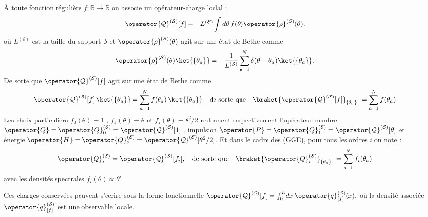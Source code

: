 À toute fonction régulière
\(
  f:\mathbb R\!\to\!\mathbb R
\)
on associe un opérateur-charge loclal :
\begin{eqnarray}\label{chap.2.charge.f.1}
	\operator{\mathcal{Q}}^{(\mathcal{S})}[f] & = &  L^{(\mathcal{S})} \int d\theta \, f(\theta) \operator{\rho}^{(\mathcal{S})}(\theta).	
\end{eqnarray}
où $ L^{(\mathcal{S})}$ est la taille du support $\mathcal{S}$ et  $\operator{\rho}^{(\mathcal{S})}(\theta)$ agit sur une état de Bethe comme 
\begin{eqnarray}\label{chap.2.rho.1}
	 \operator{\rho}^{(\mathcal{S})}(\theta) \ket{ \{ \theta_a \} } &=& \frac{1}{L^{(\mathcal{S})}} \sum_{a = 1 }^N  \delta ( \theta - \theta_a ) \ket{ \{ \theta_a \} }.	
\end{eqnarray}
De sorte que $\operator{\mathcal{Q}}^{(\mathcal{S})}[f]$ agit sur une état de Bethe comme
\begin{eqnarray}\label{chap.2.charge.1}
	\operator{\mathcal{Q}}^{(\mathcal{S})}[f]\,\ket{\{\theta_a\} } =  \sum_{a=1}^{N}f(\theta_a)\,\ket{\{\theta_a\} } \quad \mbox{de sorte que} \quad \braket{\operator{\mathcal{Q}}^{(\mathcal{S})}[f]}_{\{\theta_a\}} = \sum_{a=1}^N f(\theta_a)
\end{eqnarray}
Les choix particuliers
\(
  f_0(\theta)=1
\)
,
\(
  f_1(\theta)=\theta
\)
et
\(
  f_2(\theta)=\theta^{2}/2
\)
redonnent respectivement l'opérateur nombre \(\operator{Q}=\operator{Q}_0^{(\mathcal{S})} = \operator{\mathcal{Q}}^{(\mathcal{S})}[1]\) , impulsion \(\operator{P}=\operator{Q}_1^{(\mathcal{S})} = \operator{\mathcal{Q}}^{(\mathcal{S})}[\theta]\) et énergie
\(\operator{H}=\operator{Q}_2^{(\mathcal{S})} = \operator{\mathcal{Q}}^{(\mathcal{S})}[\theta^2/2]\). Et dans le cadre des (\gls{GGE}), pour tous les ordres $i$ on note :
\begin{eqnarray}\label{chap.2.charge.ordre.i.1}
	\operator{Q}^{(\mathcal{S})}_i = \operator{\mathcal{Q}}^{(\mathcal{S})}[f_i]	, \quad \mbox{de sorte que} \quad \braket{\operator{Q}^{(\mathcal{S})}_i}_{\{\theta_a\}} = \sum_{a=1}^N f_i(\theta_a)  
\end{eqnarray}
avec les densités spectrales $f_i(\theta) \propto \theta^i$ . 

\medskip

Ces charges conservées peuvent s’écrire sous la forme fonctionnelle
\(
  \operator{\mathcal{Q}}^{(\mathcal{S})}[f]=\int_0^{L}\!dx\;\operator{q}^{(\mathcal{S})}_{[f]}(x).
\)
où la densité associée
\(
\operator{q}^{(\mathcal{S})}_{[f]}
\)
est une observable locale.



